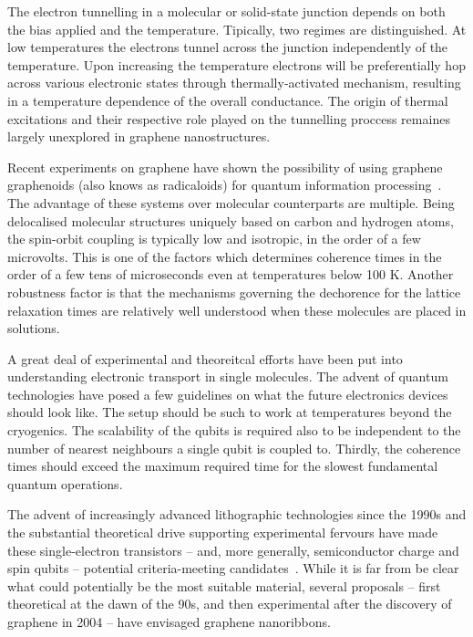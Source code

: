 The electron tunnelling in a molecular or solid-state junction depends on both the bias applied and the temperature. Tipically, two regimes are distinguished. At low temperatures the electrons tunnel across the junction independently of the temperature. Upon increasing the temperature electrons will be preferentially hop across various electronic states through thermally-activated mechanism, resulting in a temperature dependence of the overall conductance. The origin of thermal excitations and their respective role played on the tunnelling proccess remaines largely unexplored in graphene nanostructures.

Recent experiments on graphene have shown the possibility of using graphene graphenoids (also knows as radicaloids) for quantum information processing~\cite{lombardi2019quantum, lombardi2021synthetic}. The advantage of these systems over molecular counterparts are multiple. Being delocalised molecular structures uniquely based on carbon and hydrogen atoms, the spin-orbit coupling is typically low and isotropic, in the order of a few microvolts. This is one of the factors which determines coherence times in the order of a few tens of microseconds even at temperatures below 100 K. Another robustness factor is that the mechanisms governing the dechorence for the lattice relaxation times are relatively well understood when these molecules are placed in solutions.

A great deal of experimental and theoreitcal efforts have been put into understanding electronic transport in single molecules. The advent of quantum technologies have posed a few guidelines on what the future electronics devices should look like. The setup should be such to work at temperatures beyond the cryogenics. The scalability of the qubits is required also to be independent to the number of nearest neighbours a single qubit is coupled to. Thirdly, the coherence times should exceed the maximum required time for the slowest fundamental quantum operations.

The advent of increasingly advanced lithographic technologies since the 1990s and the substantial theoretical drive supporting experimental fervours have made these single-electron transistors -- and, more generally, semiconductor charge and spin qubits -- potential criteria-meeting candidates~\cite{hanson2007spins, chatterjee2021semiconductor}. While it is far from be clear what could potentially be the most suitable material, several proposals -- first theoretical at the dawn of the 90s, and then experimental after the discovery of graphene in 2004 -- have envisaged graphene nanoribbons.

